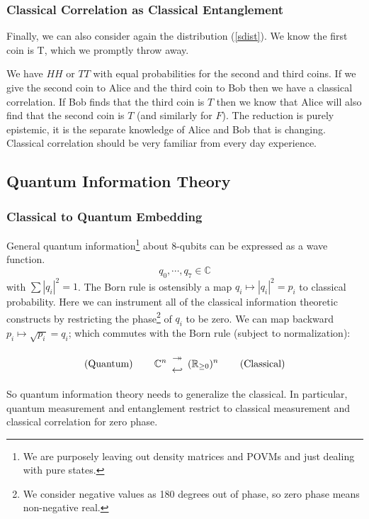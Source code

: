 \documentclass[12pt,a4paper]{article}
\theoremstyle{myrule}
\begin{document}
\subsubsection{Classical Correlation as Classical Entanglement}
Finally, we can also consider again the distribution (\ref{sdist}). We know the first coin is T, which we promptly throw away.

We have $HH$ or $TT$ with equal probabilities for the second and third coins.  If we give the second coin to Alice and the third coin to Bob then we have a classical correlation.  If Bob finds that the third coin is $T$ then we know that Alice will also find that the second coin is $T$ (and similarly for $F$).  The reduction is purely epistemic, it is the separate knowledge of Alice and Bob that is changing.  Classical correlation should be very familiar from every day experience.

\subsection{Quantum Information Theory}
\subsubsection{Classical to Quantum Embedding}
General quantum information\footnote{We are purposely leaving out density matrices and POVMs and just dealing with pure states.} about 8-qubits can be expressed as a wave function.
\[
   q_0,\cdots,q_{7} \in \mathbb{C}
\]
with $\sum |q_i|^2 = 1$.  The Born rule is ostensibly a map $q_i \mapsto |q_i|^2 = p_i$ to classical probability.  Here we can instrument all of the classical information theoretic constructs by restricting the phase\footnote{We consider negative values as 180 degrees out of phase, so zero phase means non-negative real.} of $q_i$ to be zero.  We can map backward $p_i \mapsto \sqrt{p_i} = q_i$; which commutes with the Born rule (subject to normalization):

{
\renewcommand{\arraystretch}{0.1}
\[
\text{(Quantum)} \hspace{0.3 in}
\mathbb{C}^n \begin{array}{c} \twoheadrightarrow \\ \hookleftarrow \end{array}
(\mathbb{R}_{\ge 0})^n
\hspace{0.3 in} \text{(Classical)} 
\]
}

So quantum information theory needs to generalize the classical.  In particular, quantum measurement and entanglement restrict to classical measurement and classical correlation for zero phase.
\end{document}
